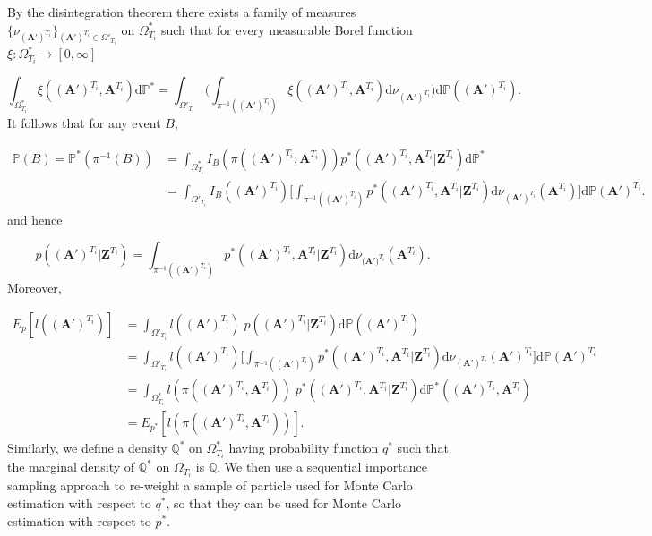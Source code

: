 \documentclass[11pt,a4paper]{article}
\newcommand{\D}{\mathrm{d}}
\renewcommand{\vec}[1]{\mathbf{#1}}
\begin{document}
By the disintegration theorem there exists a family of measures $\{ \nu_{(\vec{A}')^{T_i}}\}_{(\vec{A}')^{T_i} \in \Omega'_{T_i}}$ on $\Omega^*_{T_i}$ such that for every measurable Borel function $ \xi : \Omega^*_{T_i} \rightarrow [0, \infty]$

\begin{equation*}
    \int_{\Omega^*_{T_i}} \xi((\vec{A}')^{T_i}, \vec{A}^{T_i}) \D \mathbb{P}^* = \int_{\Omega'_{T_i}} \Bigg( \int_{\pi^{-1}((\vec{A}')^{T_i})} \xi((\vec{A}')^{T_i}, \vec{A}^{T_i}) \D \nu_{(\vec{A}')^{T_i}}  \Bigg) \D \mathbb{P}((\vec{A}')^{T_i}).
\end{equation*}
It follows that for any event $B$,

\begin{align*}
    \mathbb{P}(B) = \mathbb{P}^*(\pi^{-1}(B)) &= \int_{\Omega^*_{T_i}} I_B (\pi((\vec{A}')^{T_i}, \vec{A}^{T_i})) p^* ((\vec{A}')^{T_i}, \vec{A}^{T_i} | \vec{Z}^{T_i}) \D \mathbb{P}^* \\ 
    &= \int_{\Omega'_{T_i}} I_B ((\vec{A}')^{T_i}) \Bigg[ \int_{\pi^{-1}((\vec{A}')^{T_i})} p^* ((\vec{A}')^{T_i}, \vec{A}^{T_i} | \vec{Z}^{T_i}) \D \nu_{(\vec{A}')^{T_i}} (\vec{A}^{T_i}) \Bigg] \D \mathbb{P} (\vec{A}')^{T_i}.
\end{align*}
and hence

\begin{equation*}
    p((\vec{A}')^{T_i} | \vec{Z}^{T_i}) = \int_{\pi^{-1}((\vec{A}')^{T_i})} p^*((\vec{A}')^{T_i}, \vec{\vec{A}}^{T_i} | \vec{Z}^{T_i})\D \nu_{(\vec{A')}^{T_i}} (\vec{A}^{T_i}).
\end{equation*}
Moreover,

\begin{align*}
    E_{p}[l(\vec{(A')}^{T_i})]  &= \int_{\Omega'_{T_i}} l(\vec{(A')}^{T_i})\; p(\vec{(A')}^{T_i} | \vec{Z}^{T_i}) \D \mathbb{P}(\vec{(A')}^{T_i}) \\
    &= \int_{\Omega'_{T_i}} l(\vec{(A')}^{T_i})\Bigg[\int_{\pi^{-1}((\vec{A}')^{T_i})} p^*(\vec{(A')}^{T_i}, \vec{A}^{T_i} | \vec{Z}^{T_i}) \D \nu_{(\vec{A}')^{T_i}}(\vec{A}')^{T_i} \Bigg] \D \mathbb{P}{(\vec{A}')}^{T_i} \\ 
    &= \int_{\Omega^*_{T_i}} l(\pi(\vec{(A')}^{T_i}, \vec{A}^{T_i}))\; p^*(\vec{(A')}^{T_i}, \vec{A}^{T_i} | \vec{Z}^{T_i}) \D \mathbb{P}^*((\vec{A}')^{T_i}, \vec{A}^{T_i}) \\ 
    &= E_{p^*}[l(\pi (\vec{(A')}^{T_i}, \vec{A}^{T_i}))].
\end{align*}
Similarly, we define a density $\mathbb{Q}^*$ on $\Omega^*_{T_i}$ having probability function $q^*$ such that the marginal density of $\mathbb{Q}^*$ on $\Omega_{T_i}$ is $\mathbb{Q}$. We then use a sequential importance sampling approach to re-weight a sample of particle used for Monte Carlo estimation with respect to $q^*$, so that they can be used for Monte Carlo estimation with respect to $p^*$.
\end{document}
